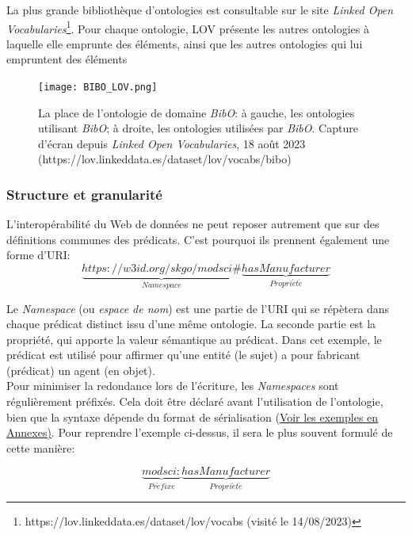 \documentclass[a4paper,12pt,twoside]{book}
\begin{document}
La plus grande bibliothèque d'ontologies est consultable sur le site \textit{Linked Open Vocabularies}\footnote{https://lov.linkeddata.es/dataset/lov/vocabs (visité le 14/08/2023)}. Pour chaque ontologie, LOV présente les autres ontologies à laquelle elle emprunte des éléments, ainsi que les autres ontologies qui lui empruntent des éléments\\

\begin{figure}[h]
    \centering
    \texttt{[image: BIBO\_LOV.png]}
    \caption{La place de l'ontologie de domaine \textit{BibO}: à gauche, les ontologies utilisant \textit{BibO}; à droite, les ontologies utilisées par \textit{BibO}. Capture d'écran depuis \textit{Linked Open Vocabularies}, 18 août 2023 (https://lov.linkeddata.es/dataset/lov/vocabs/bibo)}
    \label{fig:enter-label}
\end{figure}


\subsubsection{Structure et granularité}

L'interopérabilité du Web de données ne peut reposer autrement que sur des définitions communes des prédicats. C'est pourquoi ils prennent également une forme d'URI:\\

\large
$$
\underbrace{https://w3id.org/skgo/modsci\#}_{Namespace}\underbrace{hasManufacturer}_{Propri\acute{e}t\acute{e}}
$$
\normalsize

Le \textit{Namespace} (ou \textit{espace de nom}) est une partie de l'URI qui se répètera dans chaque prédicat distinct issu d'une même ontologie. La seconde partie est la propriété, qui apporte la valeur sémantique au prédicat. Dans cet exemple, le prédicat est utilisé pour affirmer qu'une entité (le sujet) a pour fabricant (prédicat) un agent (en objet).\\

Pour minimiser la redondance lors de l'écriture, les \textit{Namespaces} sont régulièrement préfixés. Cela doit être déclaré avant l'utilisation de l'ontologie, bien que la syntaxe dépende du format de sérialisation (\hyperref[annexe-syntaxes]{Voir les exemples en Annexes)}. Pour reprendre l'exemple ci-dessus, il sera le plus souvent formulé de cette manière: 

\large
$$
\underbrace{modsci:}_{Pr\acute{e}fixe}\underbrace{hasManufacturer}_{Propri\acute{e}t\acute{e}}
$$
\normalsize
\end{document}
